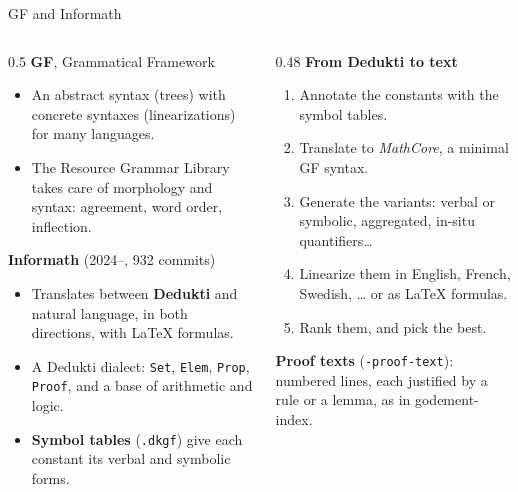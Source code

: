 \documentclass[10pt,aspectratio=169]{beamer}
\begin{document}
\begin{frame}{GF and Informath}
  \small
  \begin{columns}[T]
    \begin{column}{0.5\textwidth}
      \textbf{GF}, Grammatical Framework
      \begin{itemize}
        \item An abstract syntax (trees) with concrete syntaxes
              (linearizations) for many languages.
        \item The Resource Grammar Library takes care of morphology and
              syntax: agreement, word order, inflection.
      \end{itemize}
      \textbf{Informath} (2024--, 932 commits)
      \begin{itemize}
        \item Translates between \textbf{Dedukti} and natural language,
              in both directions, with LaTeX formulas.
        \item A Dedukti dialect: \texttt{Set}, \texttt{Elem}, \texttt{Prop},
              \texttt{Proof}, and a base of arithmetic and logic.
        \item \textbf{Symbol tables} (\texttt{.dkgf}) give each constant
              its verbal and symbolic forms.
      \end{itemize}
    \end{column}
    \begin{column}{0.48\textwidth}
      \textbf{From Dedukti to text}
      \begin{enumerate}
        \item Annotate the constants with the symbol tables.
        \item Translate to \emph{MathCore}, a minimal GF syntax.
        \item Generate the variants: verbal or symbolic, aggregated,
              in-situ quantifiers\ldots
        \item Linearize them in English, French, Swedish, \ldots
              or as LaTeX formulas.
        \item Rank them, and pick the best.
      \end{enumerate}
      \textbf{Proof texts} (\texttt{-proof-text}): numbered lines, each
      justified by a rule or a lemma, as in godement-index.
    \end{column}
  \end{columns}
\end{frame}

\end{document}
